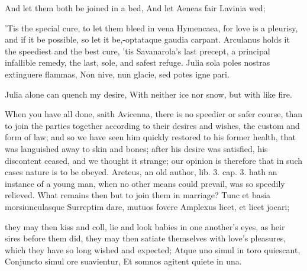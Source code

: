{And let them both be joined in a bed,
And let Aeneas fair Lavinia wed;

'Tis the special cure, to let them bleed in vena Hymencaea, for love is
a pleurisy, and if it be possible, so let it be,-optataque gaudia
carpant. Arculanus holds it the speediest and the best cure, 'tis
Savanarola's last precept, a principal infallible remedy, the
last, sole, and safest refuge.
Julia sola poles nostras extinguere flammas,
Non nive, nun glacie, sed potes igne pari.

Julia alone can quench my desire,
With neither ice nor snow, but with like fire.

When you have all done, saith Avicenna, there is no speedier or
safer course, than to join the parties together according to their
desires and wishes, the custom and form of law; and so we have seen him
quickly restored to his former health, that was languished away to skin
and bones; after his desire was satisfied, his discontent ceased, and
we thought it strange; our opinion is therefore that in such cases
nature is to be obeyed. Areteus, an old author, lib. 3. cap. 3. hath an
instance of a young man, when no other means could prevail, was
so speedily relieved. What remains then but to join them in marriage?
Tunc et basia morsiunculasque
Surreptim dare, mutuos fovere
Amplexus licet, et licet jocari;

they may then kiss and coll, lie and look babies in one another's eyes,
as heir sires before them did, they may then satiate themselves with
love's pleasures, which they have so long wished and expected;
Atque uno simul in toro quiescant,
Conjuncto simul ore suavientur,
Et somnos agitent quiete in una.

}
